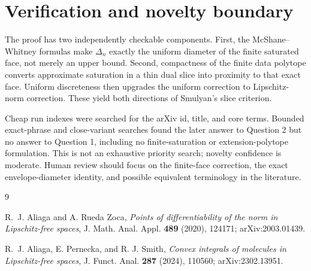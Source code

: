 \documentclass[11pt]{article}
\begin{document}
\section{Verification and novelty boundary}

The proof has two independently checkable components. First, the
McShane--Whitney formulas make $\Delta_n$ exactly the uniform diameter of the
finite saturated face, not merely an upper bound. Second, compactness of the
finite data polytope converts approximate saturation in a thin dual slice
into proximity to that exact face. Uniform discreteness then upgrades the
uniform correction to Lipschitz-norm correction. These yield both directions
of Smulyan's slice criterion.

Cheap run indexes were searched for the arXiv id, title, and core terms.
Bounded exact-phrase and close-variant searches found the later answer to
Question 2 but no answer to Question 1, including no finite-saturation or
extension-polytope formulation. This is not an exhaustive priority search;
novelty confidence is moderate. Human review should focus on the
finite-face correction, the exact envelope-diameter identity, and possible
equivalent terminology in the literature.

\begin{thebibliography}{9}

R.~J. Aliaga and A. Rueda Zoca,
\emph{Points of differentiability of the norm in Lipschitz-free spaces},
J. Math. Anal. Appl. \textbf{489} (2020), 124171;
arXiv:2003.01439.

R.~J. Aliaga, E. Pernecka, and R. J. Smith,
\emph{Convex integrals of molecules in Lipschitz-free spaces},
J. Funct. Anal. \textbf{287} (2024), 110560;
arXiv:2302.13951.

\end{thebibliography}
\end{document}
